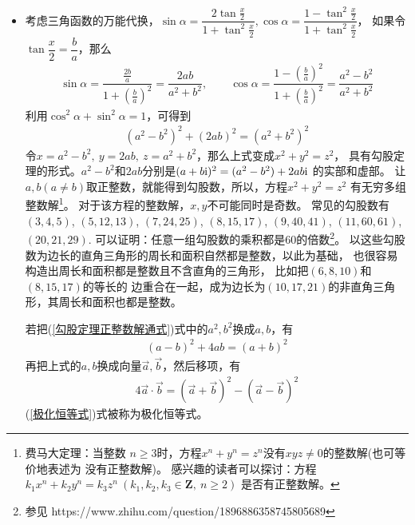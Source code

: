 \begin{itemize}[leftmargin=\inteval{\myitemleftmargin}pt,itemsep=
   \inteval{\myitemitempsep}pt,topsep=\inteval{\myitemtopsep}pt]
\item 考虑三角函数的万能代换，$ \sin\alpha=\dfrac{2\tan \frac{x}{2}}{1+\tan^2 \frac{x}{2}},\cos\alpha=\dfrac{1-\tan^2 \frac{x}{2}}{1+\tan^2 \frac{x}{2}} $，
如果令$ \tan\dfrac{x}{2}=\dfrac{b}{a} $，那么
\begin{align*}
    \sin\alpha=\dfrac{\frac{2b}{a}}{1+\left(\frac{b}{a}\right)^2}=
    \dfrac{2ab}{a^2+b^2},\quad\quad \cos\alpha=\dfrac{1-\left(\frac{b}{a}
    \right)^2}{1+\left(\frac{b}{a}\right)^2}=\dfrac{a^2-b^2}{a^2+b^2}
\end{align*}
利用$ \cos^2 \alpha+\sin^2 \alpha=1 $，可得到
\begin{gather}\label{勾股定理正整数解通式}
    (a^2-b^2)^2+(2ab)^2=(a^2+b^2)^2
\end{gather}
令$ x=a^2-b^2,\ y=2ab,\ z=a^2+b^2 $，那么上式变成$ x^2+y^2=z^2 $，
具有勾股定理的形式。$ a^2-b^2 $和$ 2ab $分别是$ (a+b\mathrm{i})^2=(a^2-b^2)+2ab\mathrm{i} $
的实部和虚部。
让$ a,b (a\neq b) $取正整数，就能得到勾股数，所以，方程$ x^2+y^2=z^2 $
有无穷多组整数解\footnote{费马大定理：当整数
$ n\geq 3 $时，方程$ x^n+y^n=z^n $没有$ xyz\neq 0 $的整数解(也可等价地表述为
没有正整数解)。
感兴趣的读者可以探讨：方程$ k_1 x^n+k_2 y^n=k_3 z^n \ 
(k_1,k_2,k_3\in \textbf{Z},\ n\geq 2 ) $ 是否有正整数解。}。
对于该方程的整数解，$ x,y $不可能同时是奇数。
常见的勾股数有 $ (3,4,5)$, $(5,12,13)$, $(7,24,25)$, 
$(8,15,17)$, $(9,40,41)$, $(11,60,61)$, $(20,21,29) $. 
可以证明：任意一组勾股数的乘积都是60的倍数\footnote{
参见 https://www.zhihu.com/question/1896886358745805689}。
以这些勾股数为边长的直角三角形的周长和面积自然都是整数，以此为基础，
也很容易构造出周长和面积都是整数且不含直角的三角形，
比如把$(6,8,10)$和$(8,15,17)$的等长的
边重合在一起，成为边长为$(10,17,21)$的非直角三角形，其周长和面积也都是整数。

若把(\ref{勾股定理正整数解通式})式中的$ a^2,b^2 $换成$ a,b $，有
\begin{align*}
    (a-b)^2+4ab=(a+b)^2
\end{align*}
再把上式的$ a,b $换成向量$ \vec{a},\vec{b} $，然后移项，有
\begin{align}\label{极化恒等式}
    4 \vec{a}\cdot \vec{b}=
    (\vec{a}+\vec{b})^2-(\vec{a}-\vec{b})^2
\end{align}
(\ref{极化恒等式})式被称为极化恒等式。


\end{itemize}
